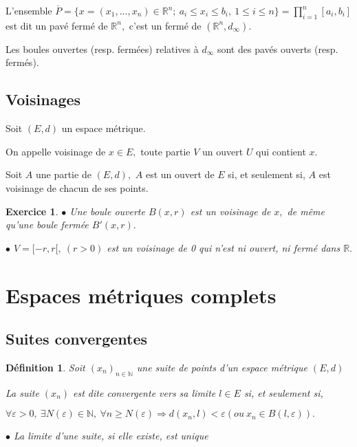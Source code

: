 \documentclass[11pt,a4paper]{report}
\newtheorem{definition}{Définition}[section]
\newtheorem{exo}{Exercice}[section]
\begin{document}
L'ensemble $\overline{P}=\{x=(x_1,...,x_n)\in \mathbb{R}^n;\:a_i\leq x_i\leq b_i,\:1\leq i\leq n\}=\prod_{i=1}^{n}[a_i,b_i]$ est dit un pavé fermé de $\mathbb{R}^n,$ c'est un fermé de $(\mathbb{R}^n,d_{\infty}).$

Les boules ouvertes (resp. fermées) relatives à $d_{\infty}$ sont des pavés ouverts (resp. fermés).

\subsection{Voisinages}

Soit $(E,d)$ un espace métrique.

On appelle voisinage de $x\in E,$ toute partie $V$ un ouvert $U$ qui contient $x.$

Soit $A$ une partie de $(E,d),$ $A$ est un ouvert de $E$ si, et seulement si, $A$ est voisinage de chacun de ses points.

\begin{exo}

$\bullet$ Une boule ouverte $B(x,r)$ est un voisinage de $x,$ de même qu'une boule fermée $B'(x,r).$

$\bullet$ $V=[-r,r[,\:(r>0)$ est un voisinage de 0 qui n'est ni ouvert, ni fermé dans $\mathbb{R}.$

\end{exo}



\section{Espaces métriques complets}
\subsection{Suites convergentes}
\begin{definition}
Soit $(x_n)_{n\in \mathbb{N}}$ une suite de points d'un espace métrique $(E,d)$

La suite $(x_n)$ est dite convergente vers sa limite $l\in E$ si, et seulement si,

$\forall\varepsilon >0,\:\exists N(\varepsilon)\in \mathbb{N},\:\forall n\geq N(\varepsilon)\Rightarrow d(x_n,l)<\varepsilon(ou\:x_n\in B(l,\varepsilon)).$

$\bullet$ La limite d'une suite, si elle existe, est unique

\end{definition}
\end{document}
